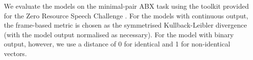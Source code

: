We evaluate the models on the minimal-pair ABX task \parencite{schatz2013evaluating} using the toolkit provided for the Zero Resource Speech Challenge \parencite{versteegh2015zero}.
For the models with continuous output, the frame-based metric is chosen as the symmetrised Kullback-Leibler divergence (with the model output normalised as necessary).
For the model with binary output, however, we use a distance of 0 for identical and 1 for non-identical vectors.

